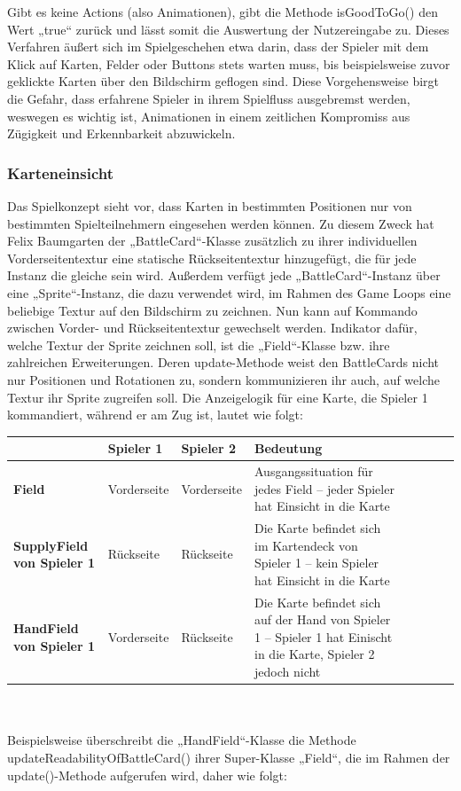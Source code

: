 Gibt es keine Actions (also Animationen), gibt die Methode isGoodToGo() den Wert „true“ zurück und lässt somit die Auswertung der Nutzereingabe zu. Dieses Verfahren äußert sich im Spielgeschehen etwa darin, dass der Spieler mit dem Klick auf Karten, Felder oder Buttons stets warten muss, bis beispielsweise zuvor geklickte Karten über den Bildschirm geflogen sind.
Diese Vorgehensweise birgt die Gefahr, dass erfahrene Spieler in ihrem Spielfluss ausgebremst werden, weswegen es wichtig ist, Animationen in einem zeitlichen Kompromiss aus Zügigkeit und Erkennbarkeit abzuwickeln.

\subsubsection{Karteneinsicht}
Das Spielkonzept sieht vor, dass Karten in bestimmten Positionen nur von bestimmten Spielteilnehmern eingesehen werden können.
Zu diesem Zweck hat Felix Baumgarten der „BattleCard“-Klasse zusätzlich zu ihrer individuellen Vorderseitentextur eine statische Rückseitentextur hinzugefügt, die für jede Instanz die gleiche sein wird. Außerdem verfügt jede „BattleCard“-Instanz über eine „Sprite“-Instanz, die dazu verwendet wird, im Rahmen des Game Loops eine beliebige Textur auf den Bildschirm zu zeichnen. Nun kann auf Kommando zwischen Vorder- und Rückseitentextur gewechselt werden.
Indikator dafür, welche Textur der Sprite zeichnen soll, ist die „Field“-Klasse bzw. ihre zahlreichen Erweiterungen. Deren update-Methode weist den BattleCards nicht nur Positionen und Rotationen zu, sondern kommunizieren ihr auch, auf welche Textur ihr Sprite zugreifen soll.
Die Anzeigelogik für eine Karte, die Spieler 1 kommandiert, während er am Zug ist, lautet wie folgt:
\\
\begin{tabular}{|p{4cm}|p{4cm}|p{4cm}|p{4.5cm}| l | c | c | r |}
\hline
 & \textbf{Spieler 1}  & \textbf{Spieler 2} & \textbf{Bedeutung} \\ \hline
\textbf{Field} & Vorderseite  & Vorderseite & Ausgangssituation für jedes Field – jeder Spieler hat Einsicht in die Karte \\ \hline
\textbf{SupplyField von Spieler 1} & Rückseite & Rückseite & Die Karte befindet sich im Kartendeck von Spieler 1 – kein Spieler hat Einsicht in die Karte \\ \hline
\textbf{HandField von Spieler 1} & Vorderseite & Rückseite & Die Karte befindet sich auf der Hand von Spieler 1 – Spieler 1 hat Einischt in die Karte, Spieler 2 jedoch nicht \\
\hline
\end{tabular}
\\ \\
Beispielsweise überschreibt die „HandField“-Klasse die Methode updateReadabilityOfBattleCard() ihrer Super-Klasse „Field“, die im Rahmen der update()-Methode aufgerufen wird, daher wie folgt:

